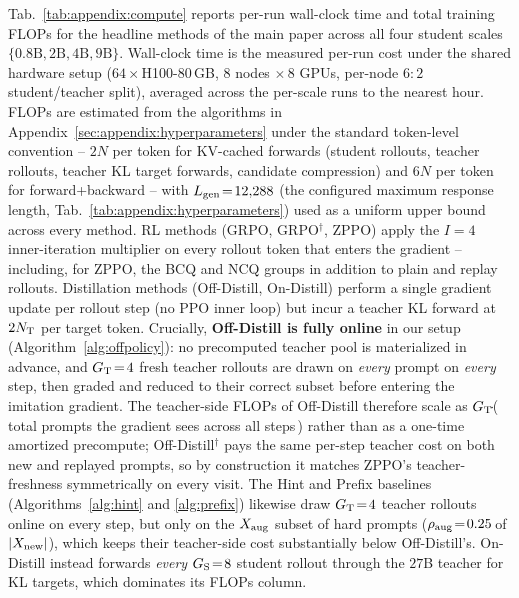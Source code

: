 Tab.~\ref{tab:appendix:compute} reports per-run wall-clock time and total training FLOPs for the headline methods of the main paper across all four student scales $\{0.8\text{B},2\text{B},4\text{B},9\text{B}\}$. Wall-clock time is the measured per-run cost under the shared hardware setup ($64\!\times\!$H100-$80$\,GB, $8$ nodes $\times\,8$ GPUs, per-node $6\!:\!2$ student/teacher split), averaged across the per-scale runs to the nearest hour. FLOPs are estimated from the algorithms in Appendix~\ref{sec:appendix:hyperparameters} under the standard token-level convention -- $2N$ per token for KV-cached forwards (student rollouts, teacher rollouts, teacher KL target forwards, candidate compression) and $6N$ per token for forward+backward -- with $L_{\rm gen}\!=\!12{,}288$ (the configured maximum response length, Tab.~\ref{tab:appendix:hyperparameters}) used as a uniform upper bound across every method. RL methods (GRPO, GRPO$^{\dagger}$, ZPPO) apply the $I\!=\!4$ inner-iteration multiplier on every rollout token that enters the gradient -- including, for ZPPO, the BCQ and NCQ groups in addition to plain and replay rollouts. Distillation methods (Off-Distill, On-Distill) perform a single gradient update per rollout step (no PPO inner loop) but incur a teacher KL forward at $2N_{\rm T}$ per target token. Crucially, \textbf{Off-Distill is fully online} in our setup (Algorithm~\ref{alg:offpolicy}): no precomputed teacher pool is materialized in advance, and $G_{\rm T}\!=\!4$ fresh teacher rollouts are drawn on \emph{every} prompt on \emph{every} step, then graded and reduced to their correct subset before entering the imitation gradient. The teacher-side FLOPs of Off-Distill therefore scale as $G_{\rm T}\!\cdot\!$(\,total prompts the gradient sees across all steps\,) rather than as a one-time amortized precompute; Off-Distill$^{\dagger}$ pays the same per-step teacher cost on both new and replayed prompts, so by construction it matches ZPPO's teacher-freshness symmetrically on every visit. The Hint and Prefix baselines (Algorithms~\ref{alg:hint} and \ref{alg:prefix}) likewise draw $G_{\rm T}\!=\!4$ teacher rollouts online on every step, but only on the $X_{\rm aug}$ subset of hard prompts ($\rho_{\rm aug}\!=\!0.25\,$of $|X_{\rm new}|$), which keeps their teacher-side cost substantially below Off-Distill's. On-Distill instead forwards \emph{every} $G_{\rm S}\!=\!8$ student rollout through the $27$B teacher for KL targets, which dominates its FLOPs column.


